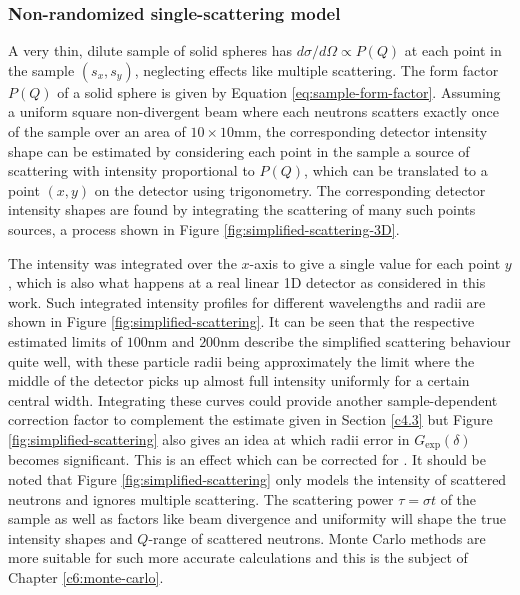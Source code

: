 \documentclass{article}
\begin{document}
\subsubsection{Non-randomized single-scattering model}
A very thin, dilute sample of solid spheres has $d\sigma/d\Omega \propto P(Q)$ at each point in the sample $(s_x, s_y)$, neglecting effects like multiple scattering. The form factor $P(Q)$ of a solid sphere is given by Equation \eqref{eq:sample-form-factor}. Assuming a uniform square non-divergent beam where each neutrons scatters exactly once of the sample over an area of $10\times10\unit{\milli\meter}$, the corresponding detector intensity shape can be estimated by considering each point in the sample a source of scattering with intensity proportional to $P(Q)$, which can be translated to a point $(x,y)$ on the detector using trigonometry. The corresponding detector intensity shapes are found by integrating the scattering of many such points sources, a process shown in Figure \ref{fig:simplified-scattering-3D}. 


The intensity was integrated over the $x$-axis to give a single value for each point $y$, which is also what happens at a real linear 1D detector as considered in this work. Such integrated intensity profiles for different wavelengths and radii are shown in Figure \ref{fig:simplified-scattering}. It can be seen that the respective estimated limits of $100 \unit{\nano\meter}$ and $200 \unit{\nano\meter}$ describe the simplified scattering behaviour quite well, with these particle radii being approximately the limit where the middle of the detector picks up almost full intensity uniformly for a certain central width. Integrating these curves could provide another sample-dependent correction factor to complement the estimate given in Section \ref{c4.3} but Figure \ref{fig:simplified-scattering} also gives an idea at which radii error in $G_\text{exp}(\delta)$ becomes significant. This is an effect which can be corrected for \cite{kusmin2017}. It should be noted that Figure \ref{fig:simplified-scattering} only models the intensity of scattered neutrons and ignores multiple scattering. The scattering power $\tau = \sigma t$ of the sample as well as factors like beam divergence and uniformity will shape the true intensity shapes and $Q$-range of scattered neutrons.  Monte Carlo methods are more suitable for such more accurate calculations and this is the subject of Chapter \ref{c6:monte-carlo}.
\end{document}
